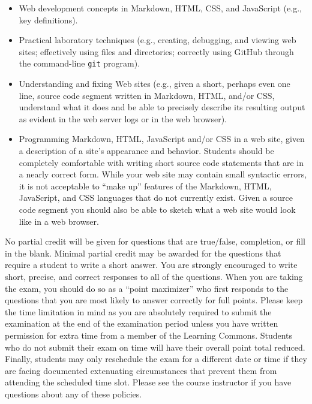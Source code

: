 \documentclass[11pt]{article}
\begin{document}
\vspace*{-.05in}
\begin{itemize}

  \itemsep 0.1in

  \item Web development concepts in Markdown, HTML, CSS, and JavaScript (e.g.,
    key definitions).

  \item Practical laboratory techniques (e.g., creating, debugging, and viewing
    web sites; effectively using files and directories; correctly using GitHub
    through the command-line {\tt git} program).

  \item Understanding and fixing Web sites (e.g., given a short, perhaps even
    one line, source code segment written in Markdown, HTML, and/or CSS,
    understand what it does and be able to precisely describe its resulting
    output as evident in the web server logs or in the web browser).

  \item Programming Markdown, HTML, JavaScript and/or CSS in a web site, given a
    description of a site's appearance and behavior. Students should be
    completely comfortable with writing short source code statements that are in
    a nearly correct form. While your web site may contain small syntactic
    errors, it is not acceptable to ``make up'' features of the Markdown, HTML,
    JavaScript, and CSS languages that do not currently exist. Given a source
    code segment you should also be able to sketch what a web site would look
    like in a web browser.

\end{itemize}

\noindent No partial credit will be given for questions that are true/false,
completion, or fill in the blank. Minimal partial credit may be awarded for the
questions that require a student to write a short answer. You are strongly
encouraged to write short, precise, and correct responses to all of the
questions. When you are taking the exam, you should do so as a ``point
maximizer'' who first responds to the questions that you are most likely to
answer correctly for full points. Please keep the time limitation in mind as you
are absolutely required to submit the examination at the end of the examination
period unless you have written permission for extra time from a member of the
Learning Commons. Students who do not submit their exam on time will have their
overall point total reduced. Finally, students may only reschedule the exam for
a different date or time if they are facing documented extenuating circumstances
that prevent them from attending the scheduled time slot. Please see the course
instructor if you have questions about any of these policies.
\end{document}
